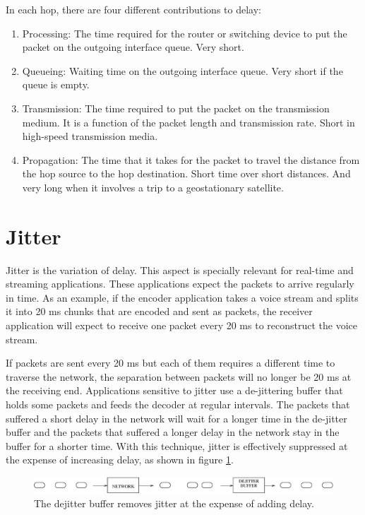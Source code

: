 In each hop, there are four different contributions to delay:
\begin{enumerate}
\item Processing: The time required for the router or switching device to put the packet on the outgoing interface queue.
Very short.
\item Queueing: Waiting time on the outgoing interface queue.
Very short if the queue is empty.
\item Transmission: The time required to put the packet on the transmission medium. It is a function of the packet length and transmission rate.
Short in high-speed transmission media.
\item Propagation: The time that it takes for the packet to travel the distance from the hop source to the hop destination.
Short time over short distances. 
And very long when it involves a trip to a geostationary satellite.
\end{enumerate}

\section{Jitter}
Jitter is the variation of delay.
This aspect is specially relevant for real-time and streaming applications.
These applications expect the packets to arrive regularly in time.
As an example, if the encoder application takes a voice stream and splits it into 20 ms chunks that are encoded and sent as packets, the receiver application will expect to receive one packet every 20 ms to reconstruct the voice stream.

If packets are sent every 20 ms but each of them requires a different time to traverse the network, the separation between packets will no longer be 20 ms at the receiving end.
Applications sensitive to jitter use a de-jittering buffer that holds some packets and feeds the decoder at regular intervals.
The packets that suffered a short delay in the network will wait for a longer time in the de-jitter buffer and the packets that suffered a longer delay in the network stay in the buffer for a shorter time.
With this technique, jitter is effectively suppressed at the expense of increasing delay, as shown in figure \ref{fig:dejitter}.

\begin{figure}[h]
\centering
\includegraphics[width=\linewidth]{figures/dejitter.eps}
\caption{The dejitter buffer removes jitter at the expense of adding delay.}
\label{fig:dejitter}
\end{figure}

